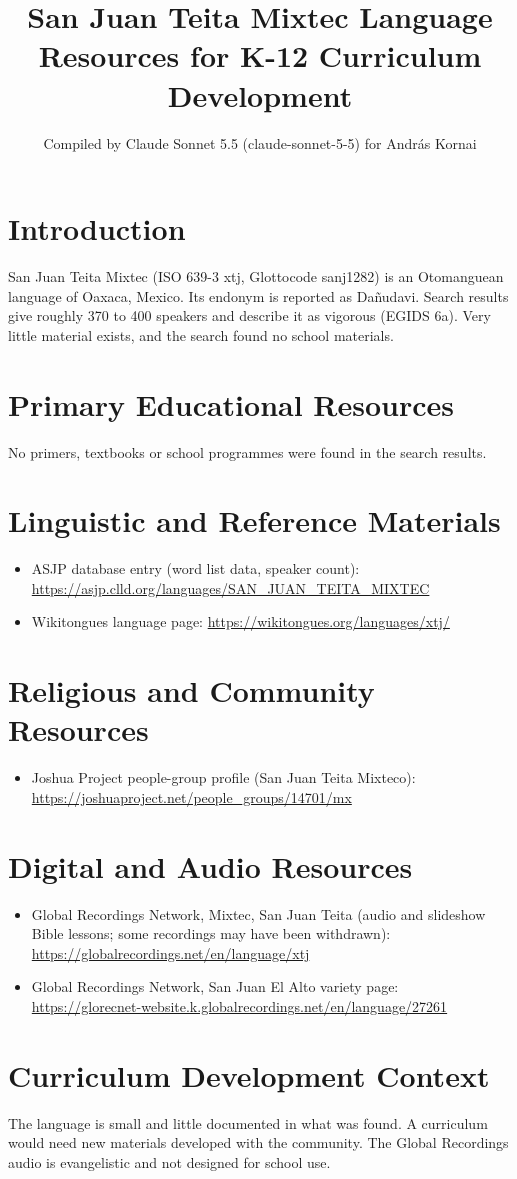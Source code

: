 \documentclass[12pt]{article}
\title{San Juan Teita Mixtec Language Resources for K-12 Curriculum Development}
\author{Compiled by Claude Sonnet 5.5 (claude-sonnet-5-5) for Andr\'as Kornai}
\date{}
\begin{document}
\maketitle
\section{Introduction}
San Juan Teita Mixtec (ISO 639-3 xtj, Glottocode sanj1282) is an Otomanguean language of Oaxaca, Mexico. Its endonym is reported as Da\~nudavi. Search results give roughly 370 to 400 speakers and describe it as vigorous (EGIDS 6a). Very little material exists, and the search found no school materials.
\section{Primary Educational Resources}
No primers, textbooks or school programmes were found in the search results.
\section{Linguistic and Reference Materials}
\begin{itemize}
\item ASJP database entry (word list data, speaker count): \url{https://asjp.clld.org/languages/SAN_JUAN_TEITA_MIXTEC}
\item Wikitongues language page: \url{https://wikitongues.org/languages/xtj/}
\end{itemize}
\section{Religious and Community Resources}
\begin{itemize}
\item Joshua Project people-group profile (San Juan Teita Mixteco): \url{https://joshuaproject.net/people_groups/14701/mx}
\end{itemize}
\section{Digital and Audio Resources}
\begin{itemize}
\item Global Recordings Network, Mixtec, San Juan Teita (audio and slideshow Bible lessons; some recordings may have been withdrawn): \url{https://globalrecordings.net/en/language/xtj}
\item Global Recordings Network, San Juan El Alto variety page: \url{https://glorecnet-website.k.globalrecordings.net/en/language/27261}
\end{itemize}
\section{Curriculum Development Context}
The language is small and little documented in what was found. A curriculum would need new materials developed with the community. The Global Recordings audio is evangelistic and not designed for school use.
\end{document}

